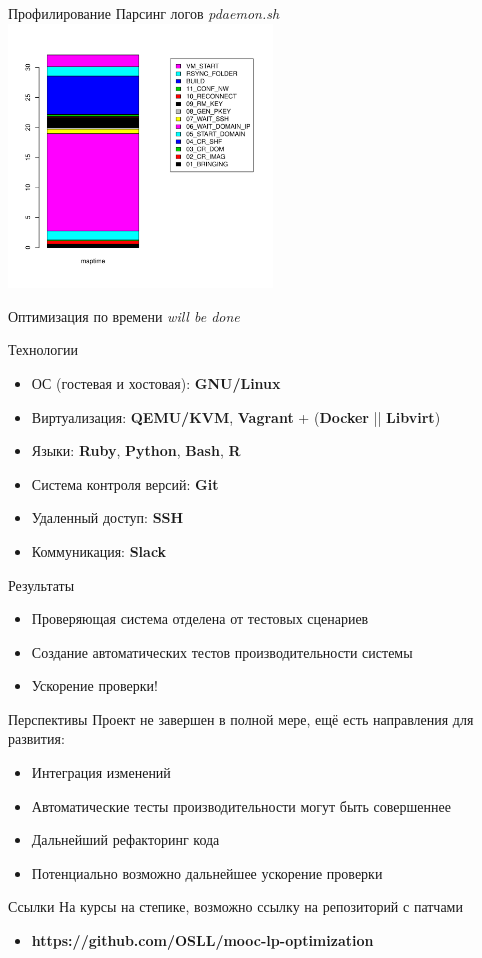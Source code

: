 \documentclass{beamer}
\begin{document}
\begin{frame}{Профилирование}
	Парсинг логов \textit{pdaemon.sh}
	\includegraphics[width=70mm]{./vm_start_bar.pdf}
\end{frame}

\begin{frame}{Оптимизация по времени}
	\textit{will be done}
\end{frame}

\begin{frame}{Технологии}
	\begin{itemize}
		\item ОС (гостевая и хостовая): \textbf{GNU/Linux}
		\item Виртуализация: \textbf{QEMU/KVM}, \textbf{Vagrant} + (\textbf{Docker} || \textbf{Libvirt})
		\item Языки: \textbf{Ruby}, \textbf{Python}, \textbf{Bash}, \textbf{R}
		\item Система контроля версий: \textbf{Git}
		\item Удаленный доступ: \textbf{SSH}
		\item Коммуникация: \textbf{Slack}
	\end{itemize}
\end{frame}

\begin{frame}{Результаты}
	\begin{itemize}
		\item Проверяющая система отделена от тестовых сценариев
		\item Создание автоматических тестов производительности системы
		\item Ускорение проверки!
	\end{itemize}
\end{frame}

\begin{frame}{Перспективы}
	Проект не завершен в полной мере, ещё есть направления для развития:
	\begin{itemize}
		\item Интеграция изменений
		\item Автоматические тесты производительности могут быть совершеннее
		\item Дальнейший рефакторинг кода
		\item Потенциально возможно дальнейшее ускорение проверки
	\end{itemize}
\end{frame}

\begin{frame}{Ссылки}
	На курсы на степике, возможно ссылку на репозиторий с патчами
	\begin{itemize}
		\item \textbf{https://github.com/OSLL/mooc-lp-optimization}
	\end{itemize}
\end{frame}
\end{document}

